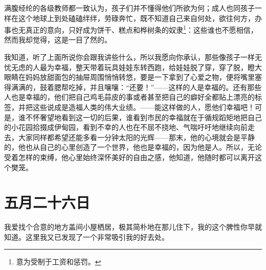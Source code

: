 \documentclass[12pt,oneside]{book}
\begin{document}
满腹经纶的各级教师都一致认为，孩子们并不懂得他们所欲为何；成人也同孩子一样在这个地球上到处磕磕绊绊，劳碌奔忙，既不知道自己来自何处，欲往何方，办事也无真正的意向，只好成为饼干、糕点和桦树条的奴隶\footnote{意为受制于工资和惩罚。}：这些谁也不愿相信，然而我却觉得，这是一目了然的。

我知道，听了上面所说你会跟我讲些什么，所以我愿向你承认，那些像孩子一样无忧无虑的人最为幸福，整天带着玩具娃娃东转西跑，给娃娃脱了穿，穿了脱，瞪大眼睛在妈妈放甜面包的抽屉周围悄悄转悠，要是一下拿到了心爱之物，便将嘴里塞得满满的，鼓着腮帮吃掉，并且嚷嚷：“还要！”——这样的人是幸福的。还有那些人也是幸福的，他们把自己鸡毛蒜皮的事或者甚至把自己的癖好全都贴上漂亮的标签，并把这些说成是造福人类的伟大业绩。——能这样做的人，愿他们幸福吧！可是，谁不怀奢望地看到这一切的后果，谁看到市民的幸福就在于循规蹈矩地把自己的小花园拾掇成伊甸园，看到不幸的人也在不屈不挠地、气喘吁吁地继续向前走去，大家同样都希望还能多看一分钟太阳的光辉——那末，他的心境就会是平静的，他也从自己的心里创造了一个世界，他也是幸福的，因为他是人。所以，无论受着怎样的束缚，他心里始终深怀美好的自由之感，他知道，他随时都可以离开这个樊笼。


\chapter{五月二十六日}
我爱找个合意的地方盖间小屋栖居，极其简朴地在那儿住下，我的这个脾性你早就知道。这里我又已发现了一个非常吸引我的好去处。
\end{document}
